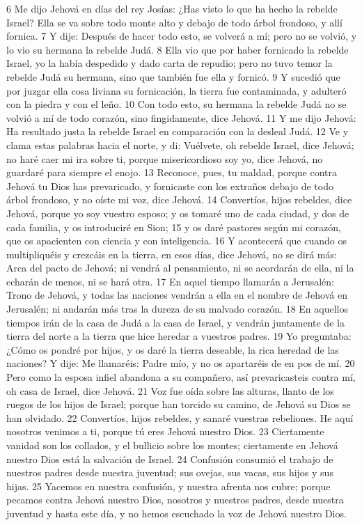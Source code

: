 6 Me dijo Jehová en días del rey Josías: ¿Has visto lo que ha hecho la rebelde Israel? Ella se va sobre todo monte alto y debajo de todo árbol frondoso, y allí fornica.
7 Y dije: Después de hacer todo esto, se volverá a mí; pero no se volvió, y lo vio su hermana la rebelde Judá.
8 Ella vio que por haber fornicado la rebelde Israel, yo la había despedido y dado carta de repudio; pero no tuvo temor la rebelde Judá su hermana, sino que también fue ella y fornicó.
9 Y sucedió que por juzgar ella cosa liviana su fornicación, la tierra fue contaminada, y adulteró con la piedra y con el leño.
10 Con todo esto, su hermana la rebelde Judá no se volvió a mí de todo corazón, sino fingidamente, dice Jehová.
11 Y me dijo Jehová: Ha resultado justa la rebelde Israel en comparación con la desleal Judá.
12 Ve y clama estas palabras hacia el norte, y di: Vuélvete, oh rebelde Israel, dice Jehová; no haré caer mi ira sobre ti, porque misericordioso soy yo, dice Jehová, no guardaré para siempre el enojo.
13 Reconoce, pues, tu maldad, porque contra Jehová tu Dios has prevaricado, y fornicaste con los extraños debajo de todo árbol frondoso, y no oíste mi voz, dice Jehová.
14 Convertíos, hijos rebeldes, dice Jehová, porque yo soy vuestro esposo; y os tomaré uno de cada ciudad, y dos de cada familia, y os introduciré en Sion;
15 y os daré pastores según mi corazón, que os apacienten con ciencia y con inteligencia.
16 Y acontecerá que cuando os multipliquéis y crezcáis en la tierra, en esos días, dice Jehová, no se dirá más: Arca del pacto de Jehová; ni vendrá al pensamiento, ni se acordarán de ella, ni la echarán de menos, ni se hará otra.
17 En aquel tiempo llamarán a Jerusalén: Trono de Jehová, y todas las naciones vendrán a ella en el nombre de Jehová en Jerusalén; ni andarán más tras la dureza de su malvado corazón.
18 En aquellos tiempos irán de la casa de Judá a la casa de Israel, y vendrán juntamente de la tierra del norte a la tierra que hice heredar a vuestros padres.
19 Yo preguntaba: ¿Cómo os pondré por hijos, y os daré la tierra deseable, la rica heredad de las naciones? Y dije: Me llamaréis: Padre mío, y no os apartaréis de en pos de mí.
20 Pero como la esposa infiel abandona a su compañero, así prevaricasteis contra mí, oh casa de Israel, dice Jehová.
21 Voz fue oída sobre las alturas, llanto de los ruegos de los hijos de Israel; porque han torcido su camino, de Jehová su Dios se han olvidado.
22 Convertíos, hijos rebeldes, y sanaré vuestras rebeliones. He aquí nosotros venimos a ti, porque tú eres Jehová nuestro Dios.
23 Ciertamente vanidad son los collados, y el bullicio sobre los montes; ciertamente en Jehová nuestro Dios está la salvación de Israel.
24 Confusión consumió el trabajo de nuestros padres desde nuestra juventud; sus ovejas, sus vacas, sus hijos y sus hijas.
25 Yacemos en nuestra confusión, y nuestra afrenta nos cubre; porque pecamos contra Jehová nuestro Dios, nosotros y nuestros padres, desde nuestra juventud y hasta este día, y no hemos escuchado la voz de Jehová nuestro Dios.

